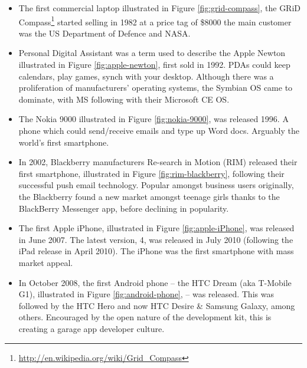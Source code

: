\documentclass[12pt, a4paper, twoside]{book}
\begin{document}
\begin{itemize}

\item The first commercial laptop illustrated in Figure \ref{fig:grid-compass}, the GRiD Compass\footnote{\url{http://en.wikipedia.org/wiki/Grid_Compass}} started selling in 1982 at a price tag of \$8000 the main customer was the US Department of Defence and NASA.

\item Personal Digital Assistant was a term used to describe the Apple Newton  illustrated in Figure \ref{fig:apple-newton}, first sold in 1992. PDAs could keep calendars, play games, synch with your desktop. Although there was a proliferation of manufacturers' operating systems, the Symbian OS came to dominate, with MS following with their Microsoft CE OS.

\item The Nokia 9000  illustrated in Figure \ref{fig:nokia-9000}, was released 1996. A phone which could send/receive emails and type up Word docs. Arguably the world's first smartphone.

\item In 2002, Blackberry manufacturers Re-search in Motion (RIM) released their first smartphone,  illustrated in Figure \ref{fig:rim-blackberry}, following their successful push email technology. Popular amongst business users originally, the Blackberry found a new market amongst teenage girls thanks to the BlackBerry Messenger app, before declining in popularity.

\item The first Apple iPhone, illustrated in Figure \ref{fig:apple-iPhone}, was released in June 2007. The latest version, 4, was released in July 2010 (following the iPad release in April 2010). The iPhone was the first smartphone with mass market appeal.

\item In October 2008, the first Android phone – the HTC Dream (aka T-Mobile G1), illustrated in Figure \ref{fig:android-phone}, – was released. This was followed by the HTC Hero and now HTC Desire \& Samsung Galaxy, among others. Encouraged by the open nature of the development kit, this is creating a garage app developer culture.

\end{itemize}
\end{document}
